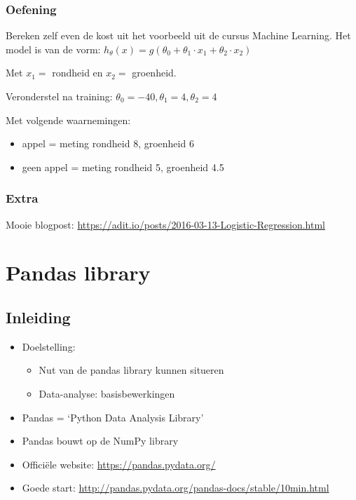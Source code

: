 \documentclass{article}
\begin{document}
\subsubsection{Oefening}

Bereken zelf even de kost uit het voorbeeld uit de cursus Machine Learning. 
Het model is van de vorm: $h_{\theta}(x) = g(\theta_0 + \theta_1\cdot x_1 + \theta_2\cdot x_2)$

Met $x_1 =$ rondheid en $x_2 =$ groenheid.

Veronderstel na training: $\theta_0 = -40, \theta_1 = 4, \theta_2 = 4$

Met volgende waarnemingen: 

\begin{itemize}
    \item appel = meting rondheid 8, groenheid 6
    \item geen appel = meting rondheid 5, groenheid 4.5
\end{itemize}

\subsubsection{Extra}

Mooie blogpost: \url{https://adit.io/posts/2016-03-13-Logistic-Regression.html}


\section{Pandas library}

\subsection{Inleiding}

\begin{itemize}
    \item Doelstelling:
    \begin{itemize}
        \item Nut van de pandas library kunnen situeren
        \item Data-analyse: basisbewerkingen
    \end{itemize}
    \item Pandas = `Python Data Analysis Library'
    \item Pandas bouwt op de NumPy library
    \item Officiële website: \url{https://pandas.pydata.org/}
    \item Goede start: \url{http://pandas.pydata.org/pandas-docs/stable/10min.html} 
\end{itemize}
\end{document}
